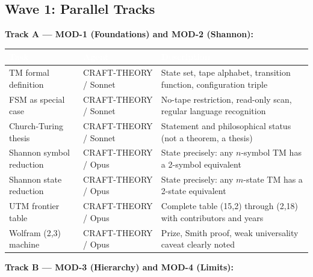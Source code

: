 \documentclass[11pt,letterpaper]{article}
\newcommand{\tableheader}[1]{\textbf{\sffamily\textcolor{white}{#1}}}
\begin{document}
\subsection{Wave 1: Parallel Tracks}

\textbf{Track A --- MOD-1 (Foundations) and MOD-2 (Shannon):}

\begin{center}
\begin{tabularx}{\textwidth}{L{3.5cm}L{2.5cm}X}
\toprule
{}
\tableheader{Task} & \tableheader{Agent} & \tableheader{Description} \\
\midrule
TM formal definition & CRAFT-THEORY / Sonnet & State set, tape alphabet, transition function, configuration triple \\
FSM as special case & CRAFT-THEORY / Sonnet & No-tape restriction, read-only scan, regular language recognition \\
Church-Turing thesis & CRAFT-THEORY / Sonnet & Statement and philosophical status (not a theorem, a thesis) \\
Shannon symbol reduction & CRAFT-THEORY / Opus & State precisely: any $n$-symbol TM has a 2-symbol equivalent \\
Shannon state reduction & CRAFT-THEORY / Opus & State precisely: any $m$-state TM has a 2-state equivalent \\
UTM frontier table & CRAFT-THEORY / Opus & Complete table (15,2) through (2,18) with contributors and years \\
Wolfram (2,3) machine & CRAFT-THEORY / Opus & Prize, Smith proof, weak universality caveat clearly noted \\
\bottomrule
\end{tabularx}
\end{center}

\textbf{Track B --- MOD-3 (Hierarchy) and MOD-4 (Limits):}
\end{document}
